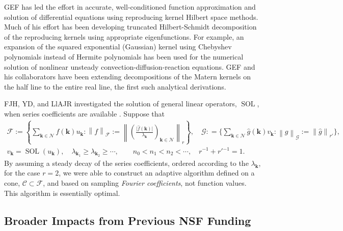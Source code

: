 \documentclass[11pt]{NSFamsart}
\newcommand{\hf}{\widehat{f}}
\newcommand{\hg}{\widehat{g}}
\DeclareMathOperator{\SOL}{SOL}
\newcommand{\bk}{{\boldsymbol{k}}}
\newcommand{\cc}{\mathcal{C}}
\newcommand{\calf}{{\mathcal{F}}}
\newcommand{\calg}{{\mathcal{G}}}
\newcommand{\caln}{{\mathcal{N}}}
\newcommand{\bigabs}[1]{\ensuremath{\bigl \lvert #1 \bigr \rvert}}
\newcommand{\norm}[2][{}]{\ensuremath{\left \lVert #2 \right \rVert}_{#1}}
\newcommand{\bignorm}[2][{}]{\ensuremath{\bigl \lVert #2 \bigr \rVert}_{#1}}
\begin{document}
GEF has led the effort in accurate, well-conditioned function approximation and solution of 
differential equations using reproducing kernel Hilbert space methods.  Much of his effort has been 
developing truncated Hilbert-Schmidt decomposition of the reproducing kernels using appropriate 
eigenfunctions.  For example, an expansion of the squared exponential (Gaussian) kernel using 
Chebyshev polynomials instead of Hermite polynomials has been used for the numerical solution of 
nonlinear unsteady 
convection-diffusion-reaction equations.  GEF and his collaborators have been extending 
decompositions of the Matern kernels on the half line to the entire real line, the first such analytical 
derivations.

FJH, YD, and LlAJR investigated the solution of general linear operators, $\SOL$, when series coefficients are available \cite{DinHic20a}.  Suppose that 
\begin{subequations} \label{serForm}
\begin{gather}
    \calf := \left \{ \sum_{\bk \in \caln} \hf(\bk) u_{\bk} : \norm[\calf]{f} := \norm[r]{\left(\frac{\bigabs{\hf(\bk)}}{\lambda_{\bk}} \right)_{\bk \in \caln}} \right \},  \quad
    \calg : = \biggl \{ \sum_{\bk \in \caln} \hg(\bk) v_{\bk} : \norm[\calg]{g} := \bignorm[r']{\hg}\biggr \}, \\ 
    v_{\bk} = \SOL(u_{\bk}), \quad
     \lambda_{\bk_1} \ge \lambda_{\bk_2} \ge \cdots, \qquad
      n_0 < n_1 < n_2 < \cdots, \quad r^{-1} + r'{}^{-1} = 1.
\end{gather}

\end{subequations}
By assuming a steady decay of the series coefficients, ordered according to the $\lambda_{\bk}$, for the case $r=2$, we were able to construct an adaptive algorithm defined on a cone, $\cc \subset \calf$, and based on sampling \emph{Fourier coefficients}, not function values.  This algorithm is essentially optimal.


\subsection{Broader Impacts from Previous NSF Funding} \label{prevBIsect}
\end{document}
